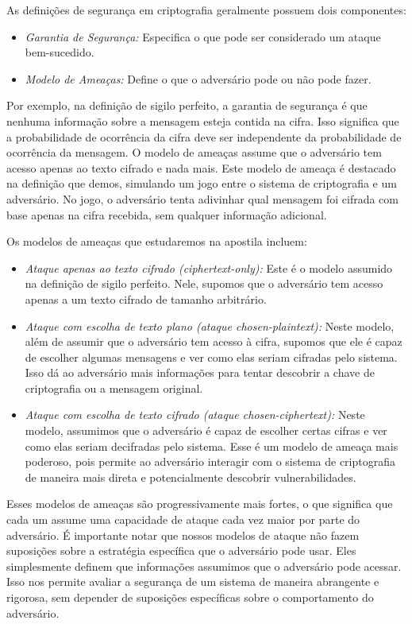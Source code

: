 As definições de segurança em criptografia geralmente possuem dois componentes:
\begin{itemize}
\item[] {\em Garantia de Segurança:} Especifica o que pode ser considerado um ataque bem-sucedido.
\item[] {\em Modelo de Ameaças:} Define o que o adversário pode ou não pode fazer.
\end{itemize}

Por exemplo, na definição de sigilo perfeito, a garantia de segurança é que nenhuma informação sobre a mensagem esteja contida na cifra.
Isso significa que a probabilidade de ocorrência da cifra deve ser independente da probabilidade de ocorrência da mensagem.
O modelo de ameaças assume que o adversário tem acesso apenas ao texto cifrado e nada mais.
Este modelo de ameaça é destacado na definição que demos, simulando um jogo entre o sistema de criptografia e um adversário.
No jogo, o adversário tenta adivinhar qual mensagem foi cifrada com base apenas na cifra recebida, sem qualquer informação adicional.

Os modelos de ameaças que estudaremos na apostila incluem:
\begin{itemize}
\item[] {\em Ataque apenas ao texto cifrado (ciphertext-only):} 
  Este é o modelo assumido na definição de sigilo perfeito.
  Nele, supomos que o adversário tem acesso apenas a um texto cifrado de tamanho arbitrário.
\item[] {\em Ataque com escolha de texto plano (ataque chosen-plaintext):}
  Neste modelo, além de assumir que o adversário tem acesso à cifra, supomos que ele é capaz de escolher algumas mensagens e ver como elas seriam cifradas pelo sistema.
  Isso dá ao adversário mais informações para tentar descobrir a chave de criptografia ou a mensagem original.
\item[] {\em Ataque com escolha de texto cifrado (ataque chosen-ciphertext):}
  Neste modelo, assumimos que o adversário é capaz de escolher certas cifras e ver como elas seriam decifradas pelo sistema.
  Esse é um modelo de ameaça mais poderoso, pois permite ao adversário interagir com o sistema de criptografia de maneira mais direta e potencialmente descobrir vulnerabilidades.
\end{itemize}

Esses modelos de ameaças são progressivamente mais fortes, o que significa que cada um assume uma capacidade de ataque cada vez maior por parte do adversário.
É importante notar que nossos modelos de ataque não fazem suposições sobre a estratégia específica que o adversário pode usar.
Eles simplesmente definem que informações assumimos que o adversário pode acessar.
Isso nos permite avaliar a segurança de um sistema de maneira abrangente e rigorosa, sem depender de suposições específicas sobre o comportamento do adversário.

